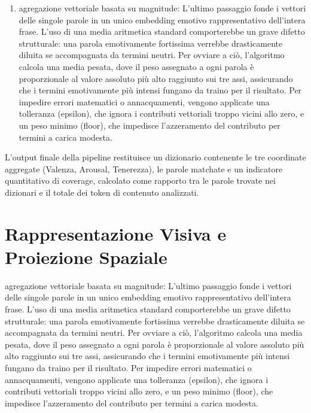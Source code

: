 \begin{enumerate}
\begin{itemize}
        e bersaglio (come "veramente" o "davvero") vengono ignorati, permettendo allo scope del modificatore di persistere intatto. 
    \end{itemize}
    \item agregazione vettoriale basata su magnitude: L'ultimo passaggio fonde i vettori delle singole parole in un unico embedding emotivo 
    rappresentativo dell'intera frase. L'uso di una media aritmetica standard comporterebbe un grave difetto strutturale: una parola emotivamente 
    fortissima verrebbe drasticamente diluita se accompagnata da termini neutri. Per ovviare a ciò, l'algoritmo calcola una media pesata, 
    dove il peso assegnato a ogni parola è proporzionale al valore assoluto più alto raggiunto sui tre assi, assicurando che i termini emotivamente 
    più intensi fungano da traino per il risultato. Per impedire errori matematici o annacquamenti, vengono applicate una tolleranza (epsilon), 
    che ignora i contributi vettoriali troppo vicini allo zero, e un peso minimo (floor), che impedisce l'azzeramento del contributo per termini a 
    carica modesta.
\end{enumerate}
L'output finale della pipeline restituisce un dizionario contenente le tre coordinate aggregate (Valenza, Arousal, Tenerezza), le parole matchate 
e un indicatore quantitativo di coverage, calcolato come rapporto tra le parole trovate nei dizionari e il totale dei token di contenuto analizzati.

\section{Rappresentazione Visiva e Proiezione Spaziale}
agregazione vettoriale basata su magnitude: L'ultimo passaggio fonde i vettori delle singole parole in un unico embedding emotivo 
    rappresentativo dell'intera frase. L'uso di una media aritmetica standard comporterebbe un grave difetto strutturale: una parola emotivamente 
    fortissima verrebbe drasticamente diluita se accompagnata da termini neutri. Per ovviare a ciò, l'algoritmo calcola una media pesata, 
    dove il peso assegnato a ogni parola è proporzionale al valore assoluto più alto raggiunto sui tre assi, assicurando che i termini emotivamente 
    più intensi fungano da traino per il risultato. Per impedire errori matematici o annacquamenti, vengono applicate una tolleranza (epsilon), 
    che ignora i contributi vettoriali troppo vicini allo zero, e un peso minimo (floor), che impedisce l'azzeramento del contributo per termini a 
    carica modesta.


